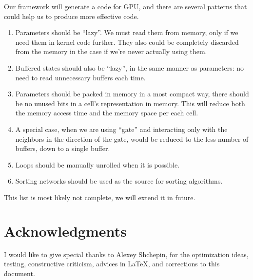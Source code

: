 \documentclass[a4paper,12pt,tikz,UTF8]{article}
\begin{document}
    Our framework will generate a code for GPU, and there are several patterns that could help us to produce more effective code.
    \begin{enumerate}
      \item Parameters should be ``lazy''. We must read them from memory, only if we need them in kernel code further. They also could be completely discarded from the memory in the case if we're never actually using them.
      \item Buffered states should also be ``lazy'', in the same manner as parameters: no need to read unnecessary buffers each time.
      \item Parameters should be packed in memory in a most compact way, there should be no unused bits in a cell's representation in memory. This will reduce both the memory access time and the memory space per each cell.
      \item A special case, when we are using ``gate'' and interacting only with the neighbors in the direction of the gate, would be reduced to the less number of buffers, down to a single buffer.
      \item Loops should be manually unrolled when it is possible.
      \item Sorting networks should be used as the source for sorting algorithms.
    \end{enumerate}
    
    This list is most likely not complete, we will extend it in future.

  \section*{Acknowledgments}

    I would like to give special thanks to Alexey Shchepin, for the optimization ideas, testing, constructive criticism, advices in \LaTeX, and corrections to this document.
\end{document}
